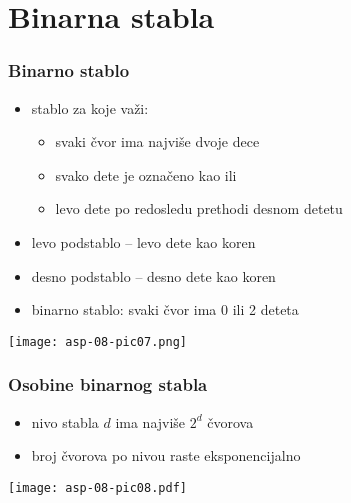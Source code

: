 \documentclass[compress]{beamer}
\begin{document}
\section[2-Stablo]{Binarna stabla}
\begin{frame}[fragile]
  \frametitle{Binarno stablo}
  \begin{itemize}
    \item stablo za koje važi:
    \begin{itemize}
      \item svaki čvor ima najviše dvoje dece
      \item svako dete je označeno kao  ili 
      \item levo dete po redosledu prethodi desnom detetu 
    \end{itemize}
    \item levo podstablo -- levo dete kao koren
    \item desno podstablo -- desno dete kao koren
    \item {} binarno stablo: svaki čvor ima 0 ili 2 deteta
  \end{itemize}
  \begin{center}
    \texttt{[image: asp-08-pic07.png]}
  \end{center}
\end{frame}

\begin{frame}[fragile]
  \frametitle{Osobine binarnog stabla}
  \begin{itemize}
    \item nivo stabla $d$ ima najviše $2^d$ čvorova
    \item broj čvorova po nivou raste eksponencijalno
  \end{itemize}
  \begin{center}
    \texttt{[image: asp-08-pic08.pdf]}
  \end{center}
\end{frame}
\end{document}

